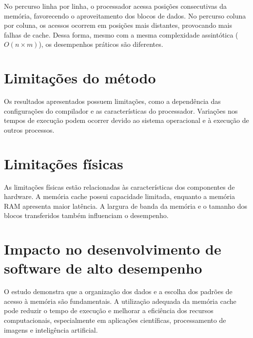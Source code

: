 No percurso linha por linha, o processador acessa posições consecutivas da memória, favorecendo o aproveitamento dos blocos de dados. No percurso coluna por coluna, os acessos ocorrem em posições mais distantes, provocando mais falhas de cache. Dessa forma, mesmo com a mesma complexidade assintótica (\(O(n \times m)\)), os desempenhos práticos são diferentes.

\section{Limitações do método}
Os resultados apresentados possuem limitações, como a dependência das configurações do compilador e as características do processador. Variações nos tempos de execução podem ocorrer devido ao sistema operacional e à execução de outros processos.

\section{Limitações físicas}
As limitações físicas estão relacionadas às características dos componentes de hardware. A memória cache possui capacidade limitada, enquanto a memória RAM apresenta maior latência. A largura de banda da memória e o tamanho dos blocos transferidos também influenciam o desempenho.

\section{Impacto no desenvolvimento de software de alto desempenho}
O estudo demonstra que a organização dos dados e a escolha dos padrões de acesso à memória são fundamentais. A utilização adequada da memória cache pode reduzir o tempo de execução e melhorar a eficiência dos recursos computacionais, especialmente em aplicações científicas, processamento de imagens e inteligência artificial.